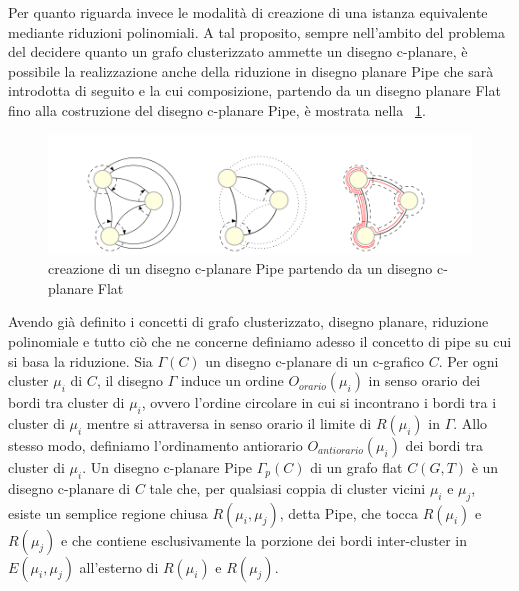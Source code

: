 {Per quanto riguarda invece le modalità di creazione di una istanza equivalente mediante riduzioni polinomiali.
A tal proposito, sempre nell'ambito del problema del decidere quanto un grafo clusterizzato ammette un disegno c-planare, è possibile la realizzazione anche della riduzione in disegno planare Pipe che sarà introdotta di seguito e la cui composizione, partendo da un disegno planare Flat fino alla costruzione del disegno c-planare Pipe, è mostrata nella  \figurename~\ref{fig:composizionePipe}.
\begin{figure}[!htb]
	\begin{center}
		\includegraphics[width=1 \linewidth]{figure/composizionePipe}
	\end{center}
	\caption{creazione di un disegno c-planare Pipe partendo da un disegno c-planare Flat \label{fig:composizionePipe}}
\end{figure}
Avendo già definito i concetti di grafo clusterizzato, disegno planare, riduzione polinomiale e tutto ciò che ne concerne definiamo adesso il concetto di pipe su cui si basa la riduzione.
Sia $\Gamma(C)$ un disegno c-planare di un c-grafico $C$. Per ogni cluster $\mu_i$ di $C$, il disegno $\Gamma$ induce un ordine $O_{orario}(\mu_i)$ in senso orario dei bordi tra cluster di $\mu_i$, ovvero l'ordine circolare in cui si incontrano i bordi tra i cluster di $\mu_i$ mentre si attraversa in senso orario il limite di $R(\mu_i)$ in $\Gamma$. Allo stesso modo, definiamo l'ordinamento antiorario $O_{antiorario}(\mu_i)$ dei bordi tra cluster di $\mu_i$. Un disegno c-planare Pipe $\Gamma_p(C)$ di un grafo flat $C(G, T)$ è un disegno c-planare di $C$ tale che, per qualsiasi coppia di cluster vicini $\mu_i$ e $\mu_j$, esiste un semplice regione chiusa $R(\mu_i, \mu_j)$, detta Pipe, che tocca $R(\mu_i)$ e $R(\mu_j)$ e che contiene esclusivamente la porzione dei bordi inter-cluster in $E(\mu_i, \mu_j)$ all'esterno di $R(\mu_i)$ e $R(\mu_j)$.\\

}
